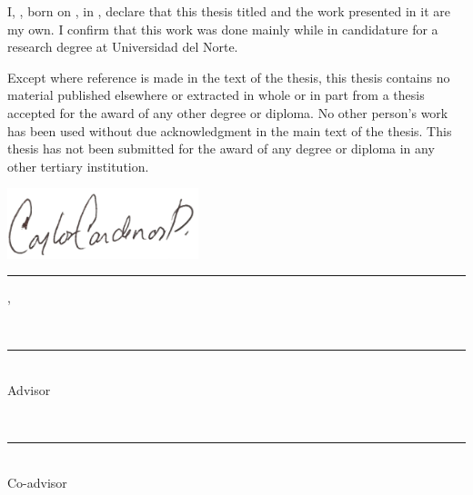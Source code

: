 
\noindent I, {\myFirstName} {\myLastName}, born on {\myBirthMonth} {\myBirthDay}, {\myBirthYear} in {\myBirthPlace}, declare that this thesis titled \emph{\myTitle} and the work presented in it are my own. I confirm that this work was done mainly while in candidature for a research degree at Universidad del Norte.

Except where reference is made in the text of the thesis, this thesis contains no material published elsewhere or extracted in whole or in part from a thesis accepted for the award of any other degree or diploma. No other person's work has been used without due acknowledgment in the main text of the thesis. This thesis has not been submitted for the award of any degree or diploma in any other tertiary institution.

\vspace{5em}


\noindent\hspace{0.5em}\includegraphics[width=15em]{figures/signature}\\
\noindent\rule[1em]{16.5em}{0.5pt}

\vspace{-1.5em}
\noindent {\myFirstName} {\myLastName} \hspace{12em} {\mySubmissionMonth} {\mySubmissionDay}, {\mySubmissionYear}

\vspace{5em}


\noindent\hspace{0.5em}\\
\noindent\rule[1em]{16.5em}{0.5pt}

\vspace{-1.5em}
\noindent {\myProfTitle} {\myProfFirstName}{ \myProfLastName}\\
Advisor

\vspace{5em}
\noindent\hspace{0.5em}\\
\noindent\rule[1em]{16.5em}{0.5pt}

\vspace{-1.5em}
\noindent {\myOtherProfTitle} {\myOtherProfFirstName}{ \myOtherProfLastName}\\
Co-advisor

